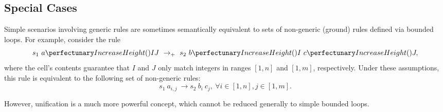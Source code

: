 \subsection{Special Cases}
Simple scenarios involving generic rules are sometimes 
semantically equivalent to sets of non-generic (ground) rules defined via bounded loops.
For example, consider the rule
\[
s_1 ~ \cpfunc{a}{IJ} ~ \rightarrow_\cpmaxpar ~ s_2 ~ \cpfunc{b}{I} ~ \cpfunc{c}{J},
\]
where the cell's contents guarantee that \(I\) and \(J\) 
only match integers in ranges \([1,n]\) and \([1,m]\), respectively.
Under these assumptions, 
this rule is equivalent to the following set of non-generic rules:
\[
s_1 ~ a_{i,j} ~ \rightarrow s_2 ~ b_i ~ c_j, ~ \forall i \in [1,n], j \in [1,m].
\]

However, unification is a much more powerful concept, 
which cannot be reduced generally to simple bounded loops.